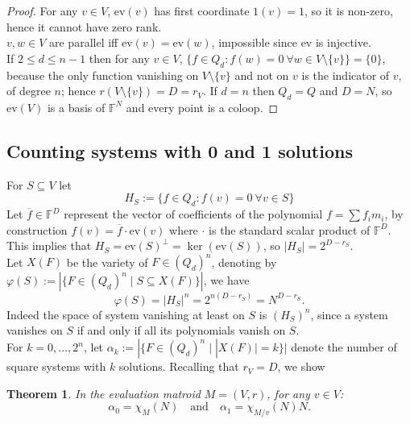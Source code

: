 \documentclass[11pt,a4paper]{article}
\newtheorem{theorem}{Theorem}[section]
\theoremstyle{definition}
\newcommand{\FF}{\mathbb{F}}
\newcommand{\ev}{\mathrm{ev}}
\begin{document}
\begin{proof}
For any $v \in V$, $\ev(v)$ has first coordinate $1(v)=1$, so it is non-zero, hence it cannot have zero rank. \\ $v,w \in V$ are parallel iff $\ev(v)=\ev(w)$, impossible since $\mathrm{ev}$ is injective. \\
If $2 \le d\le n-1$ then for any $v \in V$, $\{f\in Q_d: f(w)=0\ \forall w\in V \setminus \{v\}\}= \{0\}$, because the only function vanishing on $V\setminus\{v\}$ and not on $v$ is the indicator of $v$, of degree $n$; hence $r(V\setminus\{v\})=D=r_V$. If $d=n$ then $Q_d=Q$ and $D=N$, so $\ev(V)$ is a basis of $\FF^N$ and every point is a coloop.
\end{proof}



\subsection{Counting systems with 0 and 1 solutions}

For $S\subseteq V$ let
\[
H_S:=\{f\in Q_d: f(v)=0\ \forall v\in S\}
\]
Let $\overline{f} \in \mathbb{F}^D$ represent the vector of coefficients of the polynomial $f = \sum f_i m_i$, by construction $f(v) = \overline{f}\cdot \mathrm{ev}(v)$ where $\cdot$ is the standard scalar product of $\mathbb{F}^D$. \\

This implies that $H_S = \mathrm{ev}(S)^{\perp} =\ker(\mathrm{ev}(S))$,  so $|H_S| = 2^{D - r_S}$. \\

Let $X(F)$ be the variety of $F \in (Q_d)^n$, denoting by $\varphi(S) := | \{F \in (Q_d)^n \mid S \subseteq X(F) \} |$, we have \[ \varphi(S) = |H_S|^n = 2^{n(D - r_S)} = N^{D - r_S}. \] Indeed the space of system vanishing at least on $S$ is $(H_S)^n$, since a system vanishes on $S$ if and only if all its polynomials vanish on $S$. \\

For $k = 0, \dots, 2^n$, let $\alpha_k := |\{F \in (Q_d)^n \mid |X(F)| = k\}|$ denote the number of square systems with $k$ solutions.
Recalling that $r_V = D$, we show

\begin{theorem}\label{thm:boolean-matroid-link}
In the evaluation matroid $M = (V, r)$, for any $v \in V$:
\[
\alpha_0 = \chi_M(N) \quad \text{and} \quad \alpha_1 = \chi_{M/v}(N)N.
\]
\end{theorem}
\end{document}
